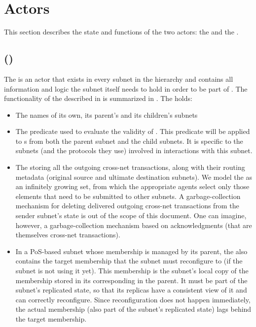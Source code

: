  \section{\ipc Actors}
 \label{sec:components}

This section describes the state and functions of the two \ipc actors: the \gw and the \sa.

\subsection{\gwFull (\gw)}
\label{sec:gw}

The \gw is an actor that exists in every subnet in the \ipc hierarchy and contains all information and logic the subnet itself needs to hold in order to be part of \ipc.
The functionality of the \gw described in  is summarized in .
The \gw holds:
\begin{itemize}
    \item The names of its own, its parent's and its children's subnets

    \item The predicate used to evaluate the validity of \pofsFull.
    This predicate will be applied to {\pof}s from both the parent subnet and the child subnets.
    It is specific to the subnets (and the protocols they use) involved in interactions with this subnet.

    \item The \postoffice storing all the outgoing cross-net transactions, along with their routing metadata (original source and ultimate destination subnets).
    We model the \postoffice as an infinitely growing set, from which the appropriate \ipc agents select only those elements that need to be submitted to other subnets.
    A garbage-collection mechanism for deleting delivered outgoing cross-net transactions from the sender subnet's state is out of the scope of this document.
    One can imagine, however, a garbage-collection mechanism based on acknowledgments (that are themselves cross-net transactions).

    \item In a PoS-based subnet whose membership is managed by its parent, the \gw also contains the target membership that the subnet must reconfigure to (if the subnet is not using it yet).
    This membership is the subnet's local copy of the membership stored in its corresponding \saFull in the parent.
    It must be part of the subnet's replicated state, so that its replicas have a consistent view of it and can correctly reconfigure.
    Since reconfiguration does not happen immediately, the actual membership (also part of the subnet's replicated state) lags behind the target membership.

\end{itemize}

